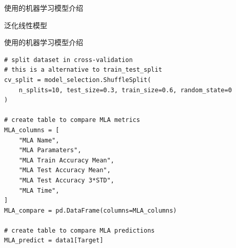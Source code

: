 \documentclass{beamer}
\begin{document}
\begin{frame}[fragile]{使用的机器学习模型介绍}
{\begin{block}{泛化线性模型}
\begin{itemize}
			\end{itemize}
		\end{block}
	}
\end{frame}

\begin{frame}[fragile]{使用的机器学习模型介绍}
	\begin{verbatim}
# split dataset in cross-validation
# this is a alternative to train_test_split
cv_split = model_selection.ShuffleSplit(
    n_splits=10, test_size=0.3, train_size=0.6, random_state=0
)

# create table to compare MLA metrics
MLA_columns = [
    "MLA Name",
    "MLA Paramaters",
    "MLA Train Accuracy Mean",
    "MLA Test Accuracy Mean",
    "MLA Test Accuracy 3*STD",
    "MLA Time",
]
MLA_compare = pd.DataFrame(columns=MLA_columns)

# create table to compare MLA predictions
MLA_predict = data1[Target]

	\end{verbatim}
\end{frame}
\end{document}
